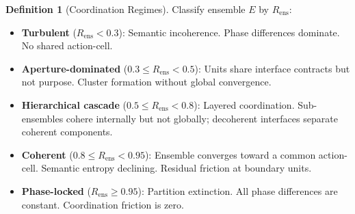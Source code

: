 \documentclass[twocolumn,a4paper,11pt]{article}
\theoremstyle{plain}
\theoremstyle{definition}
\newtheorem{definition}[theorem]{Definition}
\theoremstyle{remark}
\begin{document}
\begin{definition}[Coordination Regimes]
\label{def:regimes}
Classify ensemble $E$ by $R_\mathrm{ens}$:
\begin{itemize}[leftmargin=*]
  \item \textbf{Turbulent} ($R_\mathrm{ens} < 0.3$): Semantic incoherence.
        Phase differences dominate. No shared action-cell.
  \item \textbf{Aperture-dominated} ($0.3 \leq R_\mathrm{ens} < 0.5$):
        Units share interface contracts but not purpose. Cluster formation
        without global convergence.
  \item \textbf{Hierarchical cascade} ($0.5 \leq R_\mathrm{ens} < 0.8$):
        Layered coordination. Sub-ensembles cohere internally but not
        globally; decoherent interfaces separate coherent components.
  \item \textbf{Coherent} ($0.8 \leq R_\mathrm{ens} < 0.95$): Ensemble
        converges toward a common action-cell. Semantic entropy declining.
        Residual friction at boundary units.
  \item \textbf{Phase-locked} ($R_\mathrm{ens} \geq 0.95$): Partition
        extinction. All phase differences are constant. Coordination
        friction is zero.
\end{itemize}
\end{definition}
\end{document}
